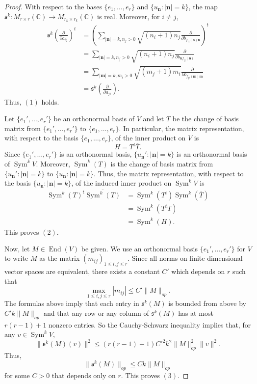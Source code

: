 \documentclass{amsart}
\theoremstyle{definition}
\theoremstyle{remark}
\numberwithin{equation}{section}
\newcommand{\tanv}[1]{\frac{\partial}{\partial #1}}
\DeclareMathOperator{\Sym}{Sym}
\DeclareMathOperator{\End}{End}
\begin{document}
\begin{proof}
With respect to the bases $\{e_1, \dotsc, e_r\}$ and $\{u_\mathbf{n} : |\mathbf{n}| = k\}$, the map $\mathfrak{s}^k : M_{r \times r}(\mathbb{C}) \to M_{r_k \times r_k}(\mathbb{C})$ is real. Moreover, for $i \neq j$,
\begin{equation*}
    \begin{split}
        \mathfrak{s}^k \left ( \tanv{a_{ij}} \right )^t & = \left ( \sum_{|\mathbf{n}| =   k, n_j >0 } \sqrt{(n_i+1)n_j} \tanv{b_{f_{ij}(\mathbf{n})\mathbf{n}}} \right )^t \\
        & = \sum_{|\mathbf{n}| =   k, n_j >0 } \sqrt{(n_i+1)n_j} \tanv{b_{\mathbf{n}f_{ij}(\mathbf{n})}} \\
        & = \sum_{|\mathbf{m}| =   k, m_i >0 } \sqrt{(m_j+1)m_i} \tanv{b_{f_{ji}(\mathbf{m})\mathbf{m}}} \\
        & = \mathfrak{s}^k \left ( \tanv{a_{ji}}\right ).
    \end{split}
\end{equation*}
Thus, $(1)$ holds.

Let $\{e_1', \dotsc, e_r'\}$ be an orthonormal basis of $V$ and let $T$ be the change of basis matrix from $\{e_1', \dotsc, e_r'\}$ to $\{e_1, \dotsc, e_r\}$. In particular, the matrix representation, with respect to the basis $\{e_1, \dotsc, e_r\}$, of the inner product on $V$ is
$$
H = T^t \overline{T}.
$$
Since $\{e_1', \dotsc, e_r'\}$ is an orthonormal basis, $\{u_\mathbf{n}' : |\mathbf{n}| = k\}$ is an orthonormal basis of $\Sym^k V$. Moreover, $\Sym^k (T)$ is the change of basis matrix from $\{u_\mathbf{n}' : |\mathbf{n}| = k\}$ to $\{u_\mathbf{n} : |\mathbf{n}| = k\}$. Thus, the matrix representation, with respect to the basis $\{u_\mathbf{n} : |\mathbf{n}| = k\}$, of the induced inner product on $\Sym^k V$ is
\begin{equation*}
\begin{split}
    \Sym^k(T)^t \overline{\Sym^k(T)} & = \Sym^k (T^t) \Sym^k(\overline{T}) \\
    & = \Sym^k (T^t\overline{T}) \\
    & = \Sym^k (H).
\end{split}
\end{equation*}
This proves $(2)$.

Now, let $M \in \End(V)$ be given. We use an orthonormal basis $\{e_1', \dotsc, e_r'\}$ for $V$ to write $M$ as the matrix $(m_{ij})_{1 \leq i,j \leq r}$. Since all norms on finite dimensional vector spaces are equivalent, there exists a constant $C'$ which depends on $r$ such that 
$$
\max_{1\leq i,j \leq r} |m_{ij}| \leq C' \|M\|_{op}.
$$
The formulas above imply that each entry in $\mathfrak{s}^k (M)$ is bounded from above by $C'k \|M\|_{op}$ and that any row or any column of $\mathfrak{s}^k (M)$ has at most $r(r-1) + 1$ nonzero entries. So the Cauchy-Schwarz inequality implies that, for any $v \in \Sym^k V$,
$$
\|\mathfrak{s}^k(M) (v)\|^2 \leq (r(r-1)+1)C'^2 k^2\|M\|_{op}^2 \|v\|^2.
$$
Thus,
$$
\|\mathfrak{s}^k (M)\|_{op} \leq Ck \|M\|_{op}
$$
for some $C > 0$ that depends only on $r$. This proves $(3)$.


\end{proof}
\end{document}
